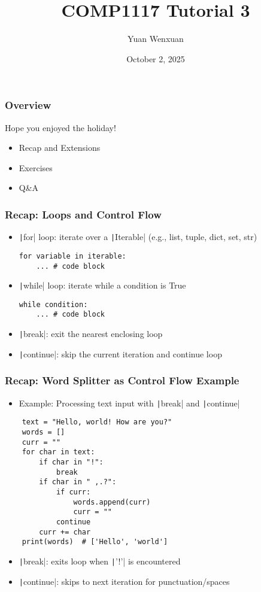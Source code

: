 \documentclass{beamer}
\title{COMP1117 Tutorial 3}
\author{Yuan Wenxuan}
\date{October 2, 2025}
\begin{document}
\frame{\titlepage}

\begin{frame}
    \frametitle{Overview}
    Hope you enjoyed the holiday!

    \begin{itemize}
        \item Recap and Extensions
        \item Exercises
        \item Q\&A
    \end{itemize}
\end{frame}

\begin{frame}[fragile]
    \frametitle{Recap: Loops and Control Flow}
    \begin{itemize}
        \item \texttt|for| loop: iterate over a \texttt|Iterable| (e.g., list, tuple, dict, set, str)
              \begin{verbatim}
for variable in iterable:
    ... # code block
              \end{verbatim}
        \item \texttt|while| loop: iterate while a condition is True
              \begin{verbatim}
while condition:
    ... # code block
              \end{verbatim}
        \item \texttt|break|: exit the nearest enclosing loop
        \item \texttt|continue|: skip the current iteration and continue loop
    \end{itemize}
\end{frame}

\begin{frame}[fragile]
    \frametitle{Recap: Word Splitter as Control Flow Example}
    \begin{itemize}
        \item Example: Processing text input with \texttt|break| and \texttt|continue|
    \end{itemize}

    \begin{verbatim}
    text = "Hello, world! How are you?"
    words = []
    curr = ""
    for char in text:
        if char in "!":
            break
        if char in " ,.?":
            if curr:
                words.append(curr)
                curr = ""
            continue
        curr += char
    print(words)  # ['Hello', 'world']
    \end{verbatim}

    \begin{itemize}
        \item \texttt|break|: exits loop when \texttt|'!'| is encountered
        \item \texttt|continue|: skips to next iteration for punctuation/spaces
    \end{itemize}
\end{frame}
\end{document}

